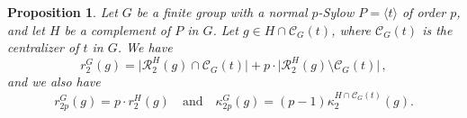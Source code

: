 \documentclass[12pt]{amsart}
\numberwithin{equation}{section}
\newtheorem{prop}[X]{Proposition}
\theoremstyle{definition}
\theoremstyle{remark}
\begin{document}
    \begin{prop}\label{rootcount-in-H}
        Let $G$ be a finite group with a normal $p$-Sylow $P=\langle t\rangle$ of order $p$, and let $H$ be a complement of $P$ in $G$. Let $g\in H\cap\mathcal{C}_G(t)$, where $\mathcal{C}_G(t)$ is the centralizer of $t$ in $G$. We have 
        \begin{equation}\label{square-rootcountinH}
            r_2^G(g)=\bigl|\mathcal{R}_2^H(g)\cap \mathcal{C}_G(t)\bigr|+p\cdot\bigl| \mathcal{R}_2^H(g)\setminus\mathcal{C}_G(t)  \bigr|  \, ,
        \end{equation}
        and we also have \begin{equation}\label{2prootcountinH}
            r_{2p}^G(g)=p\cdot r_2^H(g)\quad\text{and}\quad \kappa_{2p}^G(g)=(p-1)\kappa_2^{H\cap \mathcal{C}_G(t)}(g) .
        \end{equation}
    \end{prop}
\end{document}

